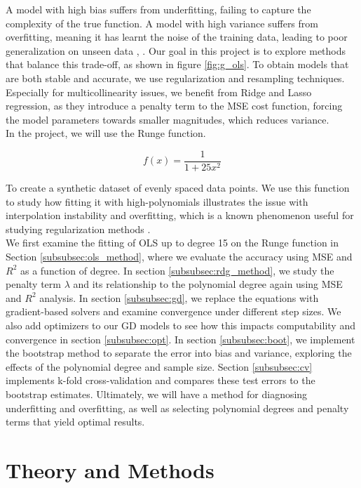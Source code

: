 \documentclass[amssymb,twocolumn,aps,floatfix]{revtex4-2}
\begin{document}
A model with high bias suffers from underfitting, failing to capture the complexity of the true function. A model with high variance suffers from overfitting, meaning it has learnt the noise of the training data, leading to poor generalization on unseen data \cite{compfys38}, \cite{hastie}. Our goal in this project is to explore methods that balance this trade-off, as shown in figure \ref{fig:g_ols}. To obtain models that are both stable and accurate, we use regularization and resampling techniques. Especially for multicollinearity issues, we benefit from Ridge and Lasso regression, as they introduce a penalty term to the MSE cost function, forcing the model parameters towards smaller magnitudes, which reduces variance. \\

In the project, we will use the Runge function.

\begin{equation}
    f(x) = \frac{1}{1 + 25x^2}
    \label{eq:runge}
\end{equation}


To create a synthetic dataset of evenly spaced data points. We use this function to study how fitting it with high-polynomials illustrates the issue with interpolation instability and overfitting, which is a known phenomenon useful for studying regularization methods \cite{wikipedia-runge}. \\

We first examine the fitting of OLS up to degree 15 on the Runge function in Section \ref{subsubsec:ols_method}, where we evaluate the accuracy using MSE and $R^2$ as a function of degree. In section \ref{subsubsec:rdg_method}, we study the penalty term $\lambda$ and its relationship to the polynomial degree again using MSE and $R^2$ analysis. In section \ref{subsubsec:gd}, we replace the equations with gradient-based solvers and examine convergence under different step sizes. We also add optimizers to our GD models to see how this impacts computability and convergence in section \ref{subsubsec:opt}. In section \ref{subsubsec:boot}, we implement the bootstrap method to separate the error into bias and variance, exploring the effects of the polynomial degree and sample size. Section \ref{subsubsec:cv} implements k-fold cross-validation and compares these test errors to the bootstrap estimates. Ultimately, we will have a method for diagnosing underfitting and overfitting, as well as selecting polynomial degrees and penalty terms that yield optimal results. 

\section{Theory and Methods}
\end{document}
